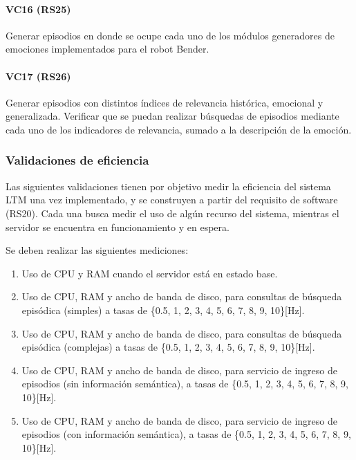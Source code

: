 \paragraph{VC16 (RS25)}
Generar episodios en donde se ocupe cada uno de los módulos generadores de emociones implementados para el robot Bender.

\paragraph{VC17 (RS26)}
Generar episodios con distintos índices de relevancia histórica, emocional y generalizada. Verificar que se puedan realizar búsquedas de episodios mediante cada uno de los indicadores de relevancia, sumado a la descripción de la emoción.

\subsubsection{Validaciones de eficiencia}




Las siguientes validaciones tienen por objetivo medir la eficiencia del sistema LTM una vez implementado, y se construyen a partir del requisito de software (RS20). Cada una busca medir el uso de algún recurso del sistema, mientras el servidor se encuentra en funcionamiento y en espera. 

Se deben realizar las siguientes mediciones:
\begin{enumerate}
	\item Uso de CPU y RAM cuando el servidor está en estado base.
	\item Uso de CPU, RAM y ancho de banda de disco, para consultas de búsqueda episódica (simples) a tasas de \{0.5, 1, 2, 3, 4, 5, 6, 7, 8, 9, 10\}[Hz].
	\item Uso de CPU, RAM y ancho de banda de disco, para consultas de búsqueda episódica (complejas) a tasas de \{0.5, 1, 2, 3, 4, 5, 6, 7, 8, 9, 10\}[Hz].
	\item Uso de CPU, RAM y ancho de banda de disco, para servicio de ingreso de episodios (sin información semántica), a tasas de \{0.5, 1, 2, 3, 4, 5, 6, 7, 8, 9, 10\}[Hz].
	\item Uso de CPU, RAM y ancho de banda de disco, para servicio de ingreso de episodios (con información semántica), a tasas de \{0.5, 1, 2, 3, 4, 5, 6, 7, 8, 9, 10\}[Hz].
\end{enumerate}

